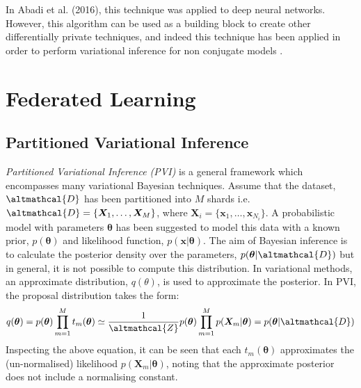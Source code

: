 In Abadi et al. (2016), this technique was applied to deep neural networks. However, this algorithm can be used as a building block to create other differentially private techniques, and indeed this technique has been applied in order to perform variational inference for non conjugate models \cite{DPVI}. 

\section{Federated Learning}
\subsection{Partitioned Variational Inference}
\emph{Partitioned Variational Inference (PVI)} is a general framework which encompasses many variational Bayesian techniques. Assume that the dataset, $\altmathcal{D}$ has been partitioned into $M$ shards i.e. $\altmathcal{D} = \lbrace \bm{X}_1, \ldots, \bm{X}_M \rbrace$, where $\bm{X}_i = \lbrace \bm{x}_1, \ldots, \bm{x}_{N_i} \rbrace$. A probabilistic model with parameters $\bm{\theta}$ has been suggested to model this data with a known prior, $p(\bm{\theta})$ and likelihood function, $p(\bm{x}| \bm{\theta})$. The aim of Bayesian inference is to calculate the posterior density over the parameters, $p(\bm{\theta}| \altmathcal{D})$ but in general, it is not possible to compute this distribution. In variational methods,  an approximate distribution, $q(\theta)$, is used to approximate the posterior. In PVI, the proposal distribution takes the form:
\begin{align}
q(\bm{\theta}) = p(\bm{\theta}) \prod_{m=1}^M t_m(\bm{\theta}) \simeq \frac{1}{\altmathcal{Z}} p(\bm{\theta}) \prod_{m=1}^M p(\bm{X}_m|\bm{\theta}) = p(\bm{\theta}| \altmathcal{D})
\end{align}
Inspecting the above equation, it can be seen that each $t_m(\bm{\theta})$ approximates the (un-normalised) likelihood $p(\bm{X}_m | \bm{\theta})$, noting that the approximate posterior does not include a normalising constant. 

